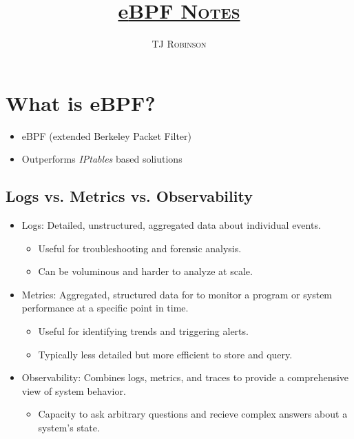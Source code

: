 \documentclass[a4paper,12pt]{article}
\begin{document}
\title{\underline{e\scshape{BPF Notes}}}
\author{\scshape{TJ Robinson}}
\maketitle

\section{What is eBPF?}
\begin{itemize}
    \item eBPF (extended Berkeley Packet Filter)
    \item Outperforms \textsl{IPtables} based soliutions
\end{itemize}

\subsection{Logs vs. Metrics vs. Observability}
\begin{itemize}
    \item Logs: Detailed, unstructured, aggregated data about individual events.
    \begin{itemize}
        \item  Useful for troubleshooting and forensic analysis.
        \item Can be voluminous and harder to analyze at scale.
    \end{itemize}
    \item Metrics: Aggregated, structured data for to monitor a program or system performance at a specific point in time.
    \begin{itemize}
        \item Useful for identifying trends and triggering alerts.
        \item Typically less detailed but more efficient to store and query.
    \end{itemize}
    \item Observability: Combines logs, metrics, and traces to provide a comprehensive view of system behavior.
    \begin{itemize}
        \item Capacity to ask arbitrary questions and recieve complex answers about a system's state.
    \end{itemize}
\end{itemize}
\end{document}
